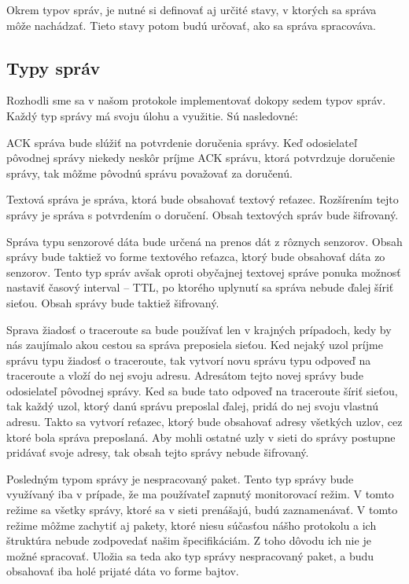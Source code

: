 \documentclass[slovak,master]{diploma}
\begin{document}
Okrem typov správ, je nutné si definovať aj určité stavy, v ktorých sa správa môže nachádzať. Tieto stavy potom budú určovať, ako sa správa spracováva.
\subsection{Typy správ}
Rozhodli sme sa v našom protokole implementovať dokopy sedem typov správ. Každý typ správy má svoju úlohu a využitie.
Sú nasledovné:

ACK správa bude slúžiť na potvrdenie doručenia správy. Keď odosielateľ pôvodnej správy niekedy neskôr príjme ACK správu, ktorá 
potvrdzuje doručenie správy, tak môžme pôvodnú správu považovať za doručenú.

Textová správa je správa, ktorá bude obsahovať textový reťazec. Rozšírením tejto správy je správa s potvrdením o doručení.
Obsah textových správ bude šifrovaný.

Správa typu senzorové dáta bude určená na prenos dát z rôznych senzorov. Obsah správy bude taktiež vo forme textového 
reťazca, ktorý bude obsahovať dáta zo senzorov. Tento typ správ avšak oproti obyčajnej textovej správe ponuka možnosť nastaviť 
časový interval -- TTL, po ktorého uplynutí sa správa nebude ďalej šíriť sieťou. Obsah správy bude taktiež šifrovaný.

Sprava žiadosť o traceroute sa bude používať len v krajných prípadoch, kedy by nás zaujímalo akou cestou sa správa preposiela sieťou. 
Ked nejaký uzol príjme správu typu žiadosť o traceroute, tak vytvorí novu správu typu odpoveď na traceroute a vloží do nej svoju adresu. 
Adresátom tejto novej správy bude odosielateľ pôvodnej správy. Ked sa bude tato odpoveď na traceroute šíriť sieťou, 
tak každý uzol, ktorý danú správu preposlal ďalej, pridá do nej svoju vlastnú adresu.
Takto sa vytvorí reťazec, ktorý bude obsahovať adresy všetkých uzlov, cez ktoré bola správa preposlaná.
Aby mohli ostatné uzly v sieti do správy postupne pridávať svoje adresy, tak obsah tejto správy nebude šifrovaný.

Posledným typom správy je nespracovaný paket. Tento typ správy bude využívaný iba v prípade, že ma používateľ zapnutý monitorovací režim.
V tomto režime sa všetky správy, ktoré sa v sieti prenášajú, budú zaznamenávať. V tomto režime môžme zachytiť aj pakety, 
ktoré niesu súčasťou nášho protokolu a ich štruktúra nebude zodpovedať našim špecifikáciám. Z toho dôvodu ich nie je možné spracovať.
Uložia sa teda ako typ správy nespracovaný paket, a budu obsahovať iba holé prijaté dáta vo forme bajtov.
\end{document}
